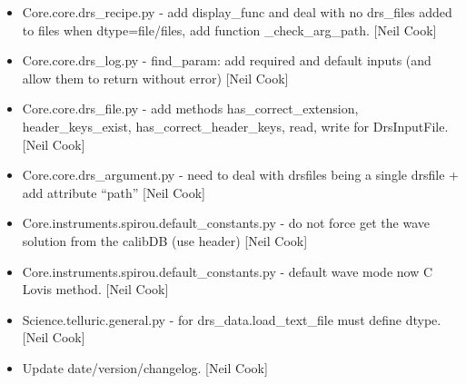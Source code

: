 \documentclass[a4paper,10pt,english]{report}
\begin{document}
\begin{itemize}
\item {} 
Core.core.drs\_recipe.py - add display\_func and deal with no drs\_files
added to files when dtype=file/files, add function \_check\_arg\_path.
{[}Neil Cook{]}

\item {} 
Core.core.drs\_log.py - find\_param: add required and default inputs
(and allow them to return without error) {[}Neil Cook{]}

\item {} 
Core.core.drs\_file.py - add methods has\_correct\_extension,
header\_keys\_exist, has\_correct\_header\_keys, read, write for
DrsInputFile. {[}Neil Cook{]}

\item {} 
Core.core.drs\_argument.py - need to deal with drsfiles being a single
drsfile + add attribute “path” {[}Neil Cook{]}

\item {} 
Core.instruments.spirou.default\_constants.py - do not force get the
wave solution from the calibDB (use header) {[}Neil Cook{]}

\item {} 
Core.instruments.spirou.default\_constants.py - default wave mode now C
Lovis method. {[}Neil Cook{]}

\item {} 
Science.telluric.general.py - for drs\_data.load\_text\_file must define
dtype. {[}Neil Cook{]}

\item {} 
Update date/version/changelog. {[}Neil Cook{]}

\end{itemize}
\end{document}
